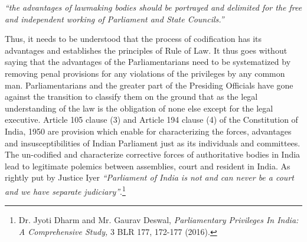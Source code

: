\begin{multicols}{2}
\vspace{-.4cm}

\noi
\begin{quoting}
\textit{“the advantages of lawmaking bodies should be portrayed and delimited for the free
and independent working of Parliament and State Councils.”}
\end{quoting}

\vspace{-.4cm}

\noi
Thus, it needs to be understood that the process of codification has its advantages and
establishes the principles of Rule of Law. It thus goes without saying that the advantages of
the Parliamentarians need to be systematized by removing penal provisions for any violations
of the privileges by any common man. Parliamentarians and the greater part of the Presiding
Officials have gone against the transition to classify them on the ground that as the legal
understanding of the law is the obligation of none else except for the legal executive. Article
105 clause (3) and Article 194 clause (4) of the Constitution of India, 1950 are provision
which enable for characterizing the forces, advantages and insusceptibilities of Indian
Parliament just as its individuals and committees. The un-codified and characterize corrective
forces of authoritative bodies in India lead to legitimate polemics between assemblies, court
and resident in India. As rightly put by Justice Iyer \textit{“Parliament of India is not and can never
be a court and we have separate judiciary”}.\footnote{Dr. Jyoti Dharm and Mr. Gaurav Deswal, \textit{Parliamentary Privileges In India: A Comprehensive Study,} 3 BLR 177, 172-177 (2016).}
\end{multicols}
